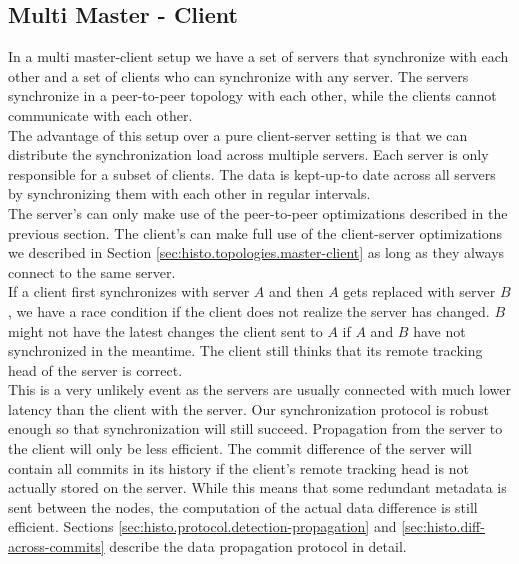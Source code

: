\subsection{Multi Master - Client}
\label{sec:histo.topologies.multi-master}
In a multi master-client setup we have a set of servers that synchronize with each other and a set of clients who can synchronize with any server.
The servers synchronize in a peer-to-peer topology with each other, while the clients cannot communicate with each other.\\
The advantage of this setup over a pure client-server setting is that we can distribute the synchronization load across multiple servers.
Each server is only responsible for a subset of clients.
The data is kept-up-to date across all servers by synchronizing them with each other in regular intervals.\\
The server's can only make use of the peer-to-peer optimizations described in the previous section.
The client's can make full use of the client-server optimizations we described in Section \ref{sec:histo.topologies.master-client} as long as they always connect to the same server.\\
If a client first synchronizes with server $ A $ and then $ A $ gets replaced with server $ B $, we have a race condition if the client does not realize the server has changed.
$ B $ might not have the latest changes the client sent to $ A $ if $ A $ and $ B $ have not synchronized in the meantime.
The client still thinks that its remote tracking head of the server is correct.\\
This is a very unlikely event as the servers are usually connected with much lower latency than the client with the server.
Our synchronization protocol is robust enough so that synchronization will still succeed.
Propagation from the server to the client will only be less efficient.
The commit difference of the server will contain all commits in its history if the client's remote tracking head is not actually stored on the server.
While this means that some redundant metadata is sent between the nodes, the computation of the actual data difference is still efficient.
Sections \ref{sec:histo.protocol.detection-propagation} and \ref{sec:histo.diff-across-commits} describe the data propagation protocol in detail.

